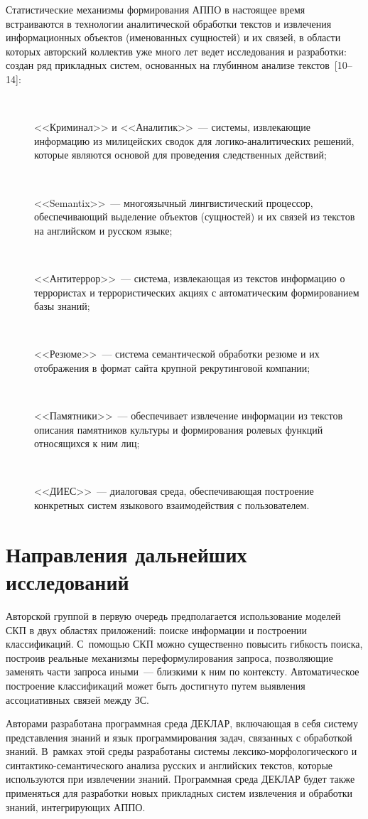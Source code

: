 \begin{multicols}{2}
     Статистические механизмы формирования \mbox{АППО} в настоящее время встраиваются в технологии 
аналитической обработки текстов и извлечения информационных объектов 
(именованных сущностей) и их связей, в области которых авторский 
коллектив уже много лет ведет исследования и разработки: создан ряд 
прикладных систем, основанных на глубинном анализе текстов~[10--14]:
  \begin{description}
  \item[\,]   
     <<Криминал>> и <<Аналитик>>~--- системы, извлекающие 
информацию из милицейских сводок для ло\-ги\-ко-ана\-ли\-ти\-че\-ских решений, 
которые являются основой для проведения следственных действий;
      \item[\,] 
     <<Semantix>>~--- многоязычный лингвистический процессор, 
обеспечивающий выделение объектов (сущностей) и их связей из текстов на 
английском и русском языке;
       \item[\,]
     <<Антитеррор>>~--- система, извлекающая из текстов информацию о 
террористах и террористических акциях с автоматическим 
формированием базы знаний;
       \item[\,]
     <<Резюме>>~--- система семантической обработки резюме и их 
отображения в формат сайта крупной рекрутинговой компании;
       \item[\,]
     <<Памятники>>~--- обеспечивает извлечение информации из текстов 
описания памятников культуры и формирования ролевых функций 
относящихся к ним лиц;
       \item[\,]
     <<ДИЕС>>~--- диалоговая среда, обеспечивающая построение 
конкретных систем языкового взаимодействия с пользователем.
\end{description}
    
   \section{Направления дальнейших исследований}
   
     Авторской группой в первую очередь предполагается использование 
моделей СКП в двух областях приложений: поиске информации и 
построении классификаций. С~помощью СКП можно существенно 
повысить гибкость поиска, построив реальные механизмы 
переформулирования запроса, позволяющие заменять части запроса 
иными~--- близкими к ним по контексту. Автоматическое построение 
классификаций может быть достигнуто путем выявления ассоциативных 
связей между ЗС. 
     
     Авторами разработана программная среда ДЕКЛАР, включающая в 
себя систему представления знаний и язык программирования задач, 
связанных с обработкой знаний. В~рамках этой среды разработаны 
системы лек\-си\-ко-мор\-фо\-ло\-ги\-че\-ско\-го и 
     син\-так\-ти\-ко-се\-ман\-ти\-че\-ско\-го анализа русских и английских 
текстов, которые используются при извлечении знаний. Программная 
среда ДЕКЛАР будет также применяться для разработки новых 
прикладных систем извлечения и обработки знаний, интегрирующих 
АППО.


\end{multicols}
